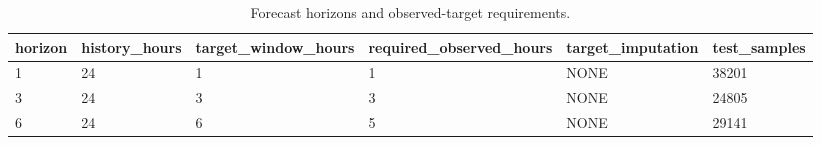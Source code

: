 \begin{table}[!htbp]
\centering
\caption{Forecast horizons and observed-target requirements.}
\begin{tabular}{llllll}
\hline
horizon & history\_hours & target\_window\_hours & required\_observed\_hours & target\_imputation & test\_samples \\ 
\hline
1 & 24 & 1 & 1 & NONE & 38201 \\
3 & 24 & 3 & 3 & NONE & 24805 \\
6 & 24 & 6 & 5 & NONE & 29141 \\
\hline
\end{tabular}
\end{table}
